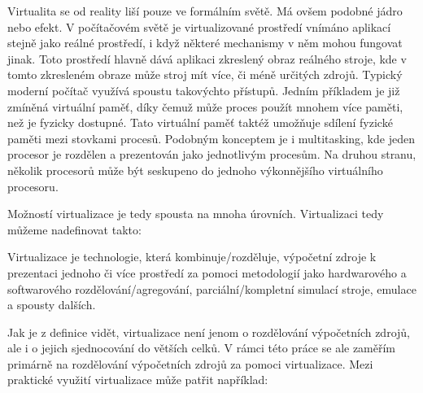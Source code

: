 Virtualita se od reality liší pouze ve formálním světě. Má ovšem podobné jádro nebo efekt. V počítačovém světě je virtualizované prostředí vnímáno aplikací stejně jako reálné prostředí, i když některé mechanismy v něm mohou fungovat jinak. Toto prostředí hlavně dává aplikaci zkreslený obraz reálného stroje, kde v tomto zkresleném obraze může stroj mít více, či méně určitých zdrojů. Typický moderní počítač využívá spoustu takovýchto přístupů. Jedním příkladem je již zmíněná virtuální paměť, díky čemuž může proces použít mnohem více paměti, než je fyzicky dostupné. Tato virtuální paměť taktéž umožňuje sdílení fyzické paměti mezi stovkami procesů. Podobným konceptem je i multitasking, kde jeden procesor je rozdělen a prezentován jako  jednotlivým procesům. Na druhou stranu, několik procesorů může být seskupeno do jednoho výkonnějšího virtuálního procesoru.

Možností virtualizace je tedy spousta na mnoha úrovních. Virtualizaci tedy můžeme nadefinovat takto:

\begin{displayquote}
    Virtualizace je technologie, která kombinuje/rozděluje, výpočetní zdroje k prezentaci jednoho či více prostředí za pomoci metodologií jako hardwarového a softwarového rozdělování/agregování, parciální/kompletní simulací stroje, emulace a spousty dalších.
\end{displayquote}

Jak je z definice vidět, virtualizace není jenom o rozdělování výpočetních zdrojů, ale i o jejich sjednocování do větších celků. V rámci této práce se ale zaměřím primárně na rozdělování výpočetních zdrojů za pomoci virtualizace. Mezi praktické využití virtualizace může patřit například:

